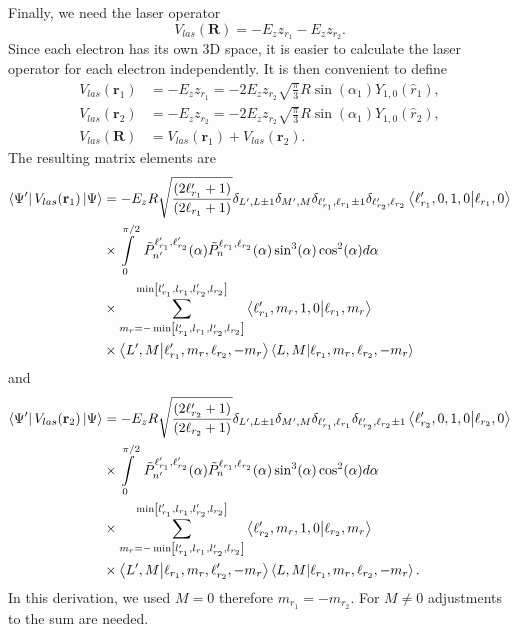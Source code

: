 Finally, we need the laser operator
\begin{equation}
     V_{las}(\mathbf{R}) = - E_z z_{r_1} - E_z z_{r_2}.
\end{equation} 
Since each electron has its own 3D space, it is easier to calculate the laser operator for each electron independently. It is then convenient to define 
\begin{align}
    V_{las}(\mathbf{r}_1) &= - E_z z_{r_1} = -2 E_z z_{r_2} \sqrt{\frac{\pi}{3}}R\sin(\alpha_1)Y_{1,0}(\hat{r}_1),\\
    V_{las}(\mathbf{r}_2) &= - E_z z_{r_2} = -2 E_z z_{r_2} \sqrt{\frac{\pi}{3}}R\sin(\alpha_1)Y_{1,0}(\hat{r}_2),\\
    V_{las}(\mathbf{R}) &= V_{las}(\mathbf{r}_1)+V_{las}(\mathbf{r}_2).
\end{align}
The resulting matrix elements are
\begin{align}
    \bra{\Psi'}V_{las}(\mathbf{r}_1)\ket{\Psi} &= - E_z R\sqrt{\frac{(2\ell_{r_1}'+1)}{(2\ell_{r_1}+1)}}\delta_{L',L\pm1}\delta_{M',M}\delta_{\ell_{r_1}',\ell_{r_1}\pm1}\delta_{\ell_{r_2}',\ell_{r_2}}\bra{\ell_{r_1}',0,1,0}\ket{\ell_{r_1},0} \\
    & \times \int\limits_0^{\pi/2}\ \tilde{P}^{\ell_{r_1}',\ell_{r_2}'}_{n'}(\alpha) \tilde{P}^{\ell_{r_1},\ell_{r_2}}_{n}(\alpha) \sin^3(\alpha) \cos^2(\alpha)d\alpha\\
    &\times \sum_{m_{r}=-\min
    \left[l_{r_1}',l_{r_1},l_{r_2}',l_{r_2}\right]}^{\min
    \left[l_{r_1}',l_{r_1},l_{r_2}',l_{r_2}\right]} \bra{\ell_{r_1}',m_{r},1,0}\ket{\ell_{r_1},m_{r}} \\
    &\times\bra{L',M}\ket{\ell_{r_1}',m_{r},\ell_{r_2},-m_{r}}\bra{L,M}\ket{\ell_{r_1},m_{r},\ell_{r_2},-m_{r}}
\end{align}
and 
\begin{align}
    \bra{\Psi'}V_{las}(\mathbf{r}_2)\ket{\Psi} &= - E_z R\sqrt{\frac{(2\ell_{r_2}'+1)}{(2\ell_{r_2}+1)}}\delta_{L',L\pm1}\delta_{M',M}\delta_{\ell_{r_1}',\ell_{r_1}}\delta_{\ell_{r_2}',\ell_{r_2}\pm1}\bra{\ell_{r_2}',0,1,0}\ket{\ell_{r_2},0} \\
    & \times \int\limits_0^{\pi/2}\ \tilde{P}^{\ell_{r_1}',\ell_{r_2}'}_{n'}(\alpha) \tilde{P}^{\ell_{r_1},\ell_{r_2}}_{n}(\alpha) \sin^3(\alpha) \cos^2(\alpha)d\alpha\\
    &\times \sum_{m_{r}=-\min
    \left[l_{r_1}',l_{r_1},l_{r_2}',l_{r_2}\right]}^{\min
    \left[l_{r_1}',l_{r_1},l_{r_2}',l_{r_2}\right]} \bra{\ell_{r_2}',m_{r},1,0}\ket{\ell_{r_2},m_{r}} \\
    &\times\bra{L',M}\ket{\ell_{r_1},m_{r},\ell_{r_2}',-m_{r}}\bra{L,M}\ket{\ell_{r_1},m_{r},\ell_{r_2},-m_{r}}.
\end{align}
In this derivation, we used $M=0$ therefore $m_{r_1}=-m_{r_2}$. For $M\ne0$ adjustments to the sum are needed.

